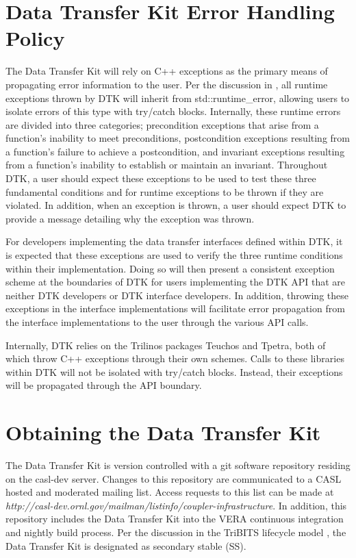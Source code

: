 \documentclass[letterpaper]{article}
\begin{document}
\section{Data Transfer Kit Error Handling Policy}
The Data Transfer Kit will rely on C++ exceptions as the
primary means of propagating error information to the user. Per the
discussion in \cite{Sutter_2004}, all runtime exceptions thrown by DTK
will inherit from std::runtime\_error, allowing users to isolate
errors of this type with try/catch blocks. Internally, these runtime
errors are divided into three categories; precondition exceptions that
arise from a function's inability to meet preconditions, postcondition
exceptions resulting from a function's failure to achieve a
postcondition, and invariant exceptions resulting from a function's
inability to establish or maintain an invariant. Throughout DTK, a
user should expect these exceptions to be used to test these three
fundamental conditions and for runtime exceptions to be thrown if they
are violated. In addition, when an exception is thrown, a user should
expect DTK to provide a message detailing why the exception was thrown.

For developers implementing the data transfer interfaces defined
within DTK, it is expected that these exceptions are used to verify
the three runtime conditions within their implementation. Doing so
will then present a consistent exception scheme at the boundaries of
DTK  for users implementing the DTK API that are neither DTK
developers or DTK interface developers. In addition, throwing these
exceptions in the interface implementations will facilitate error
propagation from the interface implementations to the user through the
various API calls. 

Internally, DTK relies on the Trilinos packages Teuchos and Tpetra,
both of which throw C++ exceptions through their own schemes. Calls to
these libraries within DTK will not be isolated with try/catch
blocks. Instead, their exceptions will be propagated through the API
boundary.

\section{Obtaining the Data Transfer Kit}
The Data Transfer Kit is version controlled with a git software
repository residing on the casl-dev server. Changes to this repository
are communicated to a CASL hosted and moderated mailing list. Access
requests to this list can be made at {\sl
  http://casl-dev.ornl.gov/mailman/listinfo/coupler-infrastructure}. In
addition, this repository includes the Data Transfer Kit into the VERA
continuous integration and nightly build process. Per the discussion
in the TriBITS lifecycle model \cite{Bartlett_2012}, the Data Transfer
Kit is designated as secondary stable (SS).
\end{document}
